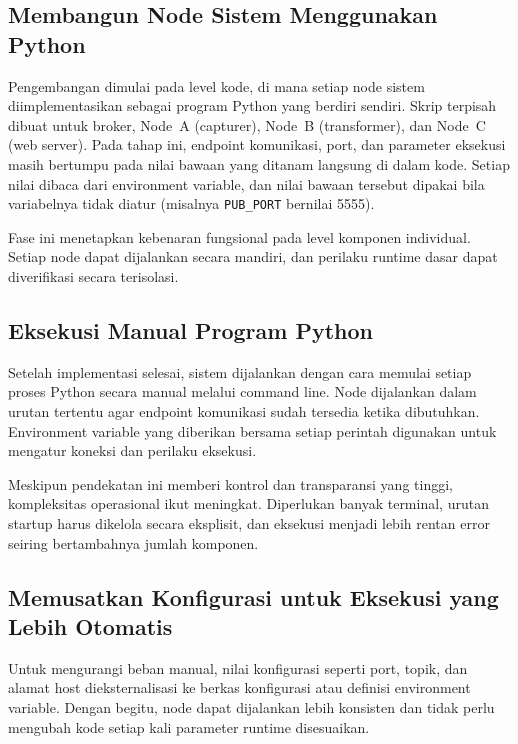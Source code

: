 \subsection{Membangun Node Sistem Menggunakan Python}

Pengembangan dimulai pada level kode, di mana setiap node sistem diimplementasikan
sebagai program Python yang berdiri sendiri. Skrip terpisah dibuat untuk broker,
Node~A (capturer), Node~B (transformer), dan Node~C (web server). Pada tahap ini,
endpoint komunikasi, port, dan parameter eksekusi masih bertumpu pada nilai bawaan
yang ditanam langsung di dalam kode. Setiap nilai dibaca dari environment
variable, dan nilai bawaan tersebut dipakai bila variabelnya tidak diatur
(misalnya \texttt{PUB\_PORT} bernilai 5555).

Fase ini menetapkan kebenaran fungsional pada level komponen individual. Setiap
node dapat dijalankan secara mandiri, dan perilaku runtime dasar dapat
diverifikasi secara terisolasi.

\subsection{Eksekusi Manual Program Python}

Setelah implementasi selesai, sistem dijalankan dengan cara memulai setiap proses
Python secara manual melalui command line. Node dijalankan dalam urutan tertentu
agar endpoint komunikasi sudah tersedia ketika dibutuhkan. Environment variable
yang diberikan bersama setiap perintah digunakan untuk mengatur koneksi dan
perilaku eksekusi.

Meskipun pendekatan ini memberi kontrol dan transparansi yang tinggi, kompleksitas
operasional ikut meningkat. Diperlukan banyak terminal, urutan startup harus
dikelola secara eksplisit, dan eksekusi menjadi lebih rentan error seiring
bertambahnya jumlah komponen.

\subsection[Memusatkan Konfigurasi untuk Eksekusi]{Memusatkan Konfigurasi untuk Eksekusi yang Lebih Otomatis}

Untuk mengurangi beban manual, nilai konfigurasi seperti port, topik, dan alamat
host dieksternalisasi ke berkas konfigurasi atau definisi environment variable.
Dengan begitu, node dapat dijalankan lebih konsisten dan tidak perlu mengubah kode
setiap kali parameter runtime disesuaikan.

